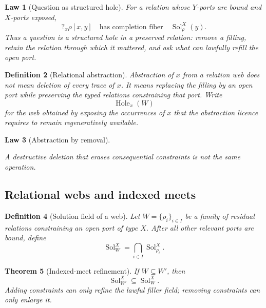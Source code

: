 \documentclass[11pt,oneside]{article}
\newtheorem{definition}{Definition}[section]
\newtheorem{law}[definition]{Law}
\newtheorem{theorem}[definition]{Theorem}
\begin{document}
\begin{law}[Question as structured hole]
For a relation whose \(Y\)-ports are bound and \(X\)-ports exposed,
\[
\boxed{
?_x\rho[x,y]
\quad\text{has completion fiber}\quad
\operatorname{Sol}^{X}_{\rho}(y).
}
\]
Thus a question is a structured hole in a preserved relation: remove a filling, retain the relation through which it mattered, and ask what can lawfully refill the open port.
\end{law}

\begin{definition}[Relational abstraction]
Abstraction of \(x\) from a relation web does not mean deletion of every trace of \(x\).  It means replacing the filling by an open port while preserving the typed relations constraining that port.  Write
\[
\boxed{
\operatorname{Hole}_x(W)
}
\]
for the web obtained by exposing the occurrences of \(x\) that the abstraction licence requires to remain regeneratively available.
\end{definition}

\begin{law}[Abstraction by removal]
\begin{center}
\end{center}
A destructive deletion that erases consequential constraints is not the same operation.
\end{law}

\subsection{Relational webs and indexed meets}

\begin{definition}[Solution field of a web]
Let \(W=\{\rho_i\}_{i\in I}\) be a family of residual relations constraining an open port of type \(X\).  After all other relevant ports are bound, define
\[
\boxed{
\operatorname{Sol}^{X}_{W}
=
\bigcap_{i\in I}\operatorname{Sol}^{X}_{\rho_i}.
}
\]
\end{definition}

\begin{theorem}[Indexed-meet refinement]
If \(W\subseteq W'\), then
\[
\boxed{
\operatorname{Sol}^{X}_{W'}
\subseteq
\operatorname{Sol}^{X}_{W}.
}
\]
Adding constraints can only refine the lawful filler field; removing constraints can only enlarge it.
\end{theorem}
\end{document}
